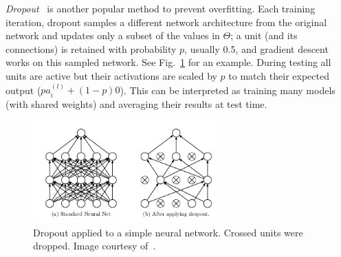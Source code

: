 \emph{Dropout}~\cite{Srivastava2014} is another popular method to prevent overfitting. Each training iteration, dropout samples a different network architecture from the original network and updates only a subset of the values in $\Theta$; a unit (and its connections) is retained with probability $p$, usually 0.5, and gradient descent works on this sampled network. See Fig.~\ref{fig:Dropout} for an example. During testing all units are active but their activations are scaled by $p$ to match their expected output ($p a^{(l)}_i + (1-p) 0$). This can be interpreted as training many models (with shared weights) and averaging their results at test time.

\begin{figure}[h]
	\centering
	\includegraphics[width = 0.65\textwidth]{plots/dropout.png}
	\caption[Example of dropout]{Dropout applied to a simple neural network. Crossed units were dropped. Image courtesy of~\cite{Srivastava2014}.}
	\label{fig:Dropout}
\end{figure}
